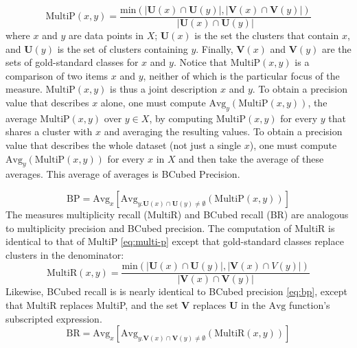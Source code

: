 {\begin{equation}\label{eq:multi-p}
\text{MultiP}(x,y) = \frac{\text{min}(|\mathbf{U}(x) \cap \mathbf{U}(y)|, |\mathbf{V}(x) \cap \mathbf{V}(y)|)}{|\mathbf{U}(x) \cap \mathbf{U}(y)|}
\end{equation}
where $x$ and $y$ are data points in $X$; $\mathbf{U}(x)$ is the set the clusters that contain $x$, 
and $\mathbf{U}(y)$ is the set of clusters containing $y$.
Finally, 
$\mathbf{V}(x)$ and $\mathbf{V}(y)$ are the sets of gold-standard classes for $x$ and $y$. 
Notice that $\text{MultiP}(x,y)$ is a comparison of two items $x$ and $y$, neither of which is the 
particular focus of the measure. $\text{MultiP}(x,y)$ is thus a joint description $x$ and $y$. 
To obtain a precision value that describes $x$ alone, one must compute $\text{Avg}_{y}(\text{MultiP} (x,y))$, the 
average $\text{MultiP}(x,y)$ over $y \in X$, by computing $\text{MultiP}(x,y)$ for every $y$ that shares a cluster with $x$ 
and averaging the resulting values. To obtain a precision value that describes the whole dataset (not just a single $x$), 
one must compute $\text{Avg}_y(\text{MultiP}(x,y))$ for every $x$ in $X$ and then take the average of these averages. 
This average of averages is BCubed Precision. 

\begin{equation}\label{eq:bp}
\text{BP}=\text{Avg}_x [\text{Avg}_{y.\mathbf{U}(x) \cap \mathbf{U}(y) \neq \emptyset}(\text{MultiP}(x,y))]
\end{equation}
The measures multiplicity recall (MultiR) and BCubed recall (BR) are analogous to multiplicity precision and
 BCubed precision. The computation of MultiR is identical to that of MultiP \eqref{eq:multi-p}
 except that gold-standard classes replace clusters in the denominator: 
\begin{equation}\label{eq:multi-r}
\text{MultiR}(x,y) = \frac{\text{min}(|\mathbf{U}(x) \cap \mathbf{U}(y)|, |\mathbf{V}(x) \cap V (y)|)}{|\mathbf{V}(x) \cap \mathbf{V}(y)|}
\end{equation}
Likewise, BCubed recall is is nearly identical to BCubed precision \eqref{eq:bp}, except that MultiR replaces MultiP, 
and the set $\mathbf{V}$ replaces $\mathbf{U}$ in the $\text{Avg}$ function's subscripted expression.
\begin{equation}\label{eq:br}
\textrm{BR} = \textrm{Avg}_x [\textrm{Avg}_{y.\mathbf{V}(x) \cap \mathbf{V}(y) \neq \emptyset}(\text{MultiR}(x,y))]
\end{equation}

}

